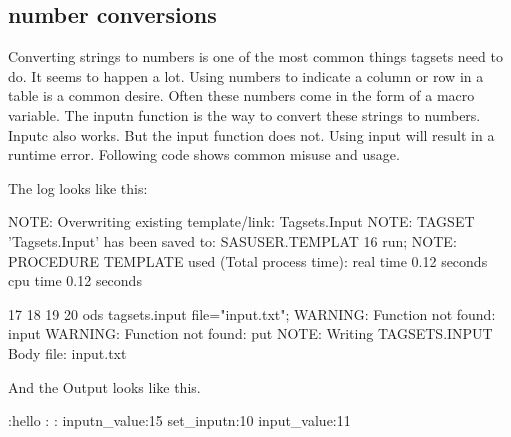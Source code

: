 \subsection{number conversions}
Converting strings to numbers is one of the most common things tagsets need to do.
It seems to happen a lot.  Using numbers to indicate a column
or row in a table is a common desire.  Often these numbers come in the form of a
macro variable.  The inputn function is the way to convert these strings to numbers.
Inputc also works.  But the input function does not.  Using input will result in
a runtime error.  Following code shows common misuse and usage.


The log looks like this:

\begin{sfvoutput}
NOTE: Overwriting existing template/link: Tagsets.Input
NOTE: TAGSET 'Tagsets.Input' has been saved to: SASUSER.TEMPLAT
16         run;
NOTE: PROCEDURE TEMPLATE used (Total process time):
      real time           0.12 seconds
      cpu time            0.12 seconds
      

17         
18         %
19         
20         ods tagsets.input file="input.txt";
WARNING: Function not found: input
WARNING: Function not found: put
NOTE: Writing TAGSETS.INPUT Body file: input.txt
\end{sfvoutput}

And the Output looks like this.

\begin{sfvoutput}
:hello          :
:
inputn_value:15
set_inputn:10
input_value:11
\end{sfvoutput}

